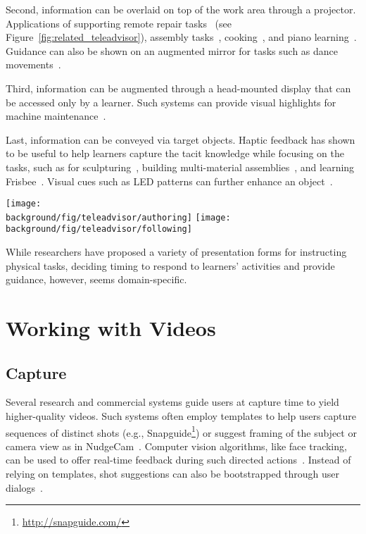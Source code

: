 Second, information can be overlaid on top of the work area through a projector. Applications of supporting remote repair tasks~\cite{Gurevich:2012ko} (see Figure~\ref{fig:related_teleadvisor}), assembly tasks~\cite{Kirk:2006:CRG:1124772.1124951}, cooking~\cite{Ju:2001:CIC:634067.634227}, and piano learning~\cite{Xiao:2016:IEI:2858036.2858577}.
%
Guidance can also be shown on an augmented mirror for tasks such as dance movements~\cite{Anderson:2013:YEM:2501988.2502045}.

Third, information can be augmented through a head-mounted display that can be accessed only by a learner. Such systems can provide visual highlights for machine maintenance~\cite{Henderson:2011ff}.

Last, information can be conveyed via target objects. Haptic feedback has shown to be useful to help learners capture the tacit knowledge while focusing on the tasks, such as for sculpturing~\cite{Zoran:2013:FFD:2470654.2481361,Agrawal:2015:PPS:2807442.2807505}, building multi-material assemblies~\cite{Schoop:2016:DSS:2851581.2892429}, and learning Frisbee~\cite{Solomon:2014:UTI:2540930.2540965}. Visual cues such as LED patterns can further enhance an object~\cite{Solomon:2014:UTI:2540930.2540965}.

\begin{figure*}[t!]
  \centering
  \texttt{[image: \\background/fig/teleadvisor/authoring]}
  \texttt{[image: \\background/fig/teleadvisor/following]}
  \caption{TeleAdvisor~\cite{Gurevich:2012ko} provides an authoring interface (left) for an instructor to guide a remote worker through a repair task (right).}
  \label{fig:related_teleadvisor}
\end{figure*}

While researchers have proposed a variety of presentation forms for instructing physical tasks, deciding timing to respond to learners' activities and provide guidance, however, seems domain-specific.




\section{Working with Videos}
\label{related_videos}


\subsection{Capture}
Several research and commercial systems guide users at capture time to yield higher-quality videos. Such systems often employ templates to help users capture sequences of distinct shots (e.g., Snapguide\footnote{\url{http://snapguide.com/}}) or suggest framing of the subject or camera view as in NudgeCam~\cite{Carter:2010}. Computer vision algorithms, like face tracking, can be used to offer real-time feedback during such directed actions~\cite{Davis:2003cu,Heer:2004ba,Carter:2010}. Instead of relying on templates, shot suggestions can also be bootstrapped through user dialogs~\cite{Adams:2005}.

